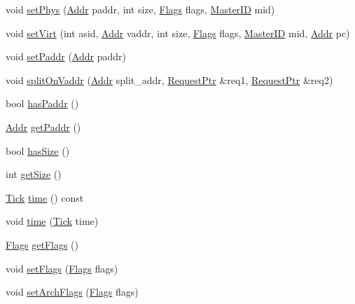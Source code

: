 \begin{DoxyCompactItemize}
\item 
void \hyperlink{classRequest_a61d0f89bbbb687136ff3fc5701a32f90}{setPhys} (\hyperlink{base_2types_8hh_af1bb03d6a4ee096394a6749f0a169232}{Addr} paddr, int size, \hyperlink{classFlags}{Flags} flags, \hyperlink{request_8hh_ac366b729262fd8e7cbd3283da6f775cf}{MasterID} mid)
\item 
void \hyperlink{classRequest_a63cbf386080363fe7c7b364bb2fe3b3e}{setVirt} (int asid, \hyperlink{base_2types_8hh_af1bb03d6a4ee096394a6749f0a169232}{Addr} vaddr, int size, \hyperlink{classFlags}{Flags} flags, \hyperlink{request_8hh_ac366b729262fd8e7cbd3283da6f775cf}{MasterID} mid, \hyperlink{base_2types_8hh_af1bb03d6a4ee096394a6749f0a169232}{Addr} pc)
\item 
void \hyperlink{classRequest_a688b841276b48f5c420569e62a090130}{setPaddr} (\hyperlink{base_2types_8hh_af1bb03d6a4ee096394a6749f0a169232}{Addr} paddr)
\item 
void \hyperlink{classRequest_ae170370b8e735017a61a913b767f0d9d}{splitOnVaddr} (\hyperlink{base_2types_8hh_af1bb03d6a4ee096394a6749f0a169232}{Addr} split\_\-addr, \hyperlink{classRequest}{RequestPtr} \&req1, \hyperlink{classRequest}{RequestPtr} \&req2)
\item 
bool \hyperlink{classRequest_af9673cab591724dc74122a8e663389ce}{hasPaddr} ()
\item 
\hyperlink{base_2types_8hh_af1bb03d6a4ee096394a6749f0a169232}{Addr} \hyperlink{classRequest_a744ef11a5afe9d3651ce5f954259cb43}{getPaddr} ()
\item 
bool \hyperlink{classRequest_aa0a08d6a3e0e8ca6801d0b8668b2800a}{hasSize} ()
\item 
int \hyperlink{classRequest_a3c4029b904a61a9873e6d12785ce19a1}{getSize} ()
\item 
\hyperlink{base_2types_8hh_a5c8ed81b7d238c9083e1037ba6d61643}{Tick} \hyperlink{classRequest_aaaea92a2d64ddb509862dd876becf90b}{time} () const 
\item 
void \hyperlink{classRequest_a16d60ed54e8670a5cf18b0fe19551768}{time} (\hyperlink{base_2types_8hh_a5c8ed81b7d238c9083e1037ba6d61643}{Tick} time)
\item 
\hyperlink{classFlags}{Flags} \hyperlink{classRequest_a8552aa8d45c9ba10449d51ac08e7d490}{getFlags} ()
\item 
void \hyperlink{classRequest_a33971d22712c9c80177e4362dffd5580}{setFlags} (\hyperlink{classFlags}{Flags} flags)
\item 
void \hyperlink{classRequest_ae865b4f9ef7305fb13ed6e3be9e82b49}{setArchFlags} (\hyperlink{classFlags}{Flags} flags)

\end{DoxyCompactItemize}
